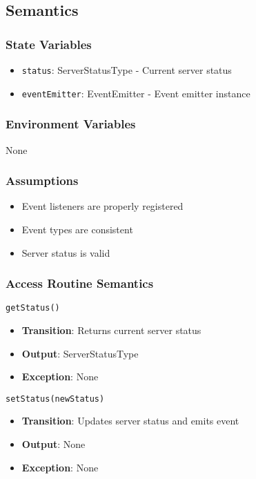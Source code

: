 \documentclass[12pt, titlepage]{article}
\begin{document}
\subsection{Semantics}

\subsubsection{State Variables}
\begin{itemize}
\item \texttt{status}: ServerStatusType - Current server status
\item \texttt{eventEmitter}: EventEmitter - Event emitter instance
\end{itemize}

\subsubsection{Environment Variables}
None

\subsubsection{Assumptions}
\begin{itemize}
\item Event listeners are properly registered
\item Event types are consistent
\item Server status is valid
\end{itemize}

\subsubsection{Access Routine Semantics}
\texttt{getStatus()}
\begin{itemize}
\item \textbf{Transition}: Returns current server status
\item \textbf{Output}: ServerStatusType
\item \textbf{Exception}: None
\end{itemize}

\texttt{setStatus(newStatus)}
\begin{itemize}
\item \textbf{Transition}: Updates server status and emits event
\item \textbf{Output}: None
\item \textbf{Exception}: None
\end{itemize}
\end{document}
